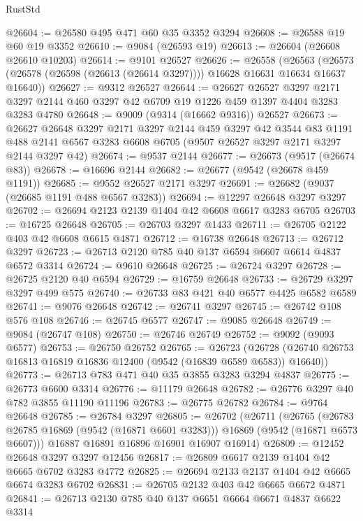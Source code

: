 \begin{lexlean}{RustStd}
\begin{coremodule}
@26604 := @26580 @495 @471 @60 @35 @3352 @3294
@26608 := @26588 @19 @60 @19 @3352
@26610 := @9084 (@26593 @19)
@26613 := @26604 (@26608 @26610 @10203)
@26614 := @9101 @26527
@26626 := @26558
    (@26563 (@26573 (@26578 (@26598 (@26613 (@26614 @3297)))) @16628 @16631 @16634 @16637 @16640))
@26627 := @9312 @26527
@26644 := @26627
    @26527
    @3297
    @2171
    @3297
    @2144
    @460
    @3297
    @42
    @6709
    @19
    @1226
    @459
    @1397
    @4404
    @3283
    @3283
    @4780
@26648 := @9009 (@9314 (@16662 @9316)) @26527
@26673 := @26627
    @26648
    @3297
    @2171
    @3297
    @2144
    @459
    @3297
    @42
    @3544
    @83
    @1191
    @488
    @2141
    @6567
    @3283
    @6608
    @6705
    (@9507 @26527 @3297 @2171 @3297 @2144 @3297 @42)
@26674 := @9537 @2144
@26677 := @26673 (@9517 (@26674 @83))
@26678 := @16696 @2144
@26682 := @26677 (@9542 (@26678 @459 @1191))
@26685 := @9552 @26527 @2171 @3297
@26691 := @26682 (@9037 (@26685 @1191 @488 @6567 @3283))
@26694 := @12297 @26648 @3297 @3297
@26702 := @26694 @2123 @2139 @1404 @42 @6608 @6617 @3283 @6705
@26703 := @16725 @26648
@26705 := @26703 @3297 @1433
@26711 := @26705 @2122 @403 @42 @6608 @6615 @4871
@26712 := @16738 @26648
@26713 := @26712 @3297
@26723 := @26713 @2120 @785 @40 @137 @6594 @6607 @6614 @4837 @6572 @3314
@26724 := @9610 @26648
@26725 := @26724 @3297
@26728 := @26725 @2120 @40 @6594
@26729 := @16759 @26648
@26733 := @26729 @3297 @3297 @499 @575
@26740 := @26733 @83 @421 @40 @6577 @4425 @6582 @6589
@26741 := @9076 @26648
@26742 := @26741 @3297
@26745 := @26742 @108 @576 @108
@26746 := @26745 @6577
@26747 := @9085 @26648
@26749 := @9084 (@26747 @108)
@26750 := @26746 @26749
@26752 := @9092 (@9093 @6577)
@26753 := @26750 @26752
@26765 := @26723
    (@26728 (@26740 @26753 @16813 @16819 @16836 @12400 (@9542 (@16839 @6589 @6583)) @16640))
@26773 := @26713 @783 @471 @40 @35 @3855 @3283 @3294 @4837
@26775 := @26773 @6600 @3314
@26776 := @11179 @26648
@26782 := @26776 @3297 @40 @782 @3855 @11190 @11196
@26783 := @26775 @26782
@26784 := @9764 @26648
@26785 := @26784 @3297
@26805 := @26702
    (@26711
      (@26765
        (@26783 @26785 @16869 (@9542 (@16871 @6601 @3283)))
        @16869
        (@9542 (@16871 @6573 @6607)))
      @16887
      @16891
      @16896
      @16901
      @16907
      @16914)
@26809 := @12452 @26648 @3297 @3297 @12456
@26817 := @26809 @6617 @2139 @1404 @42 @6665 @6702 @3283 @4772
@26825 := @26694 @2133 @2137 @1404 @42 @6665 @6674 @3283 @6702
@26831 := @26705 @2132 @403 @42 @6665 @6672 @4871
@26841 := @26713 @2130 @785 @40 @137 @6651 @6664 @6671 @4837 @6622 @3314

\end{coremodule}
\end{lexlean}
